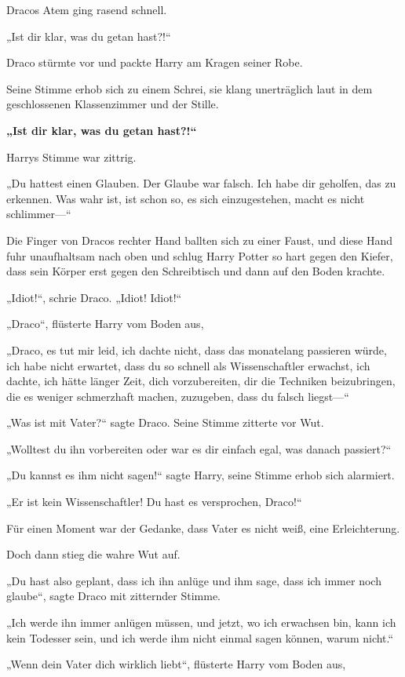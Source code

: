 {Dracos Atem ging rasend schnell.

„Ist dir klar, was du getan hast?!“

Draco stürmte vor und packte Harry am Kragen seiner Robe.

Seine Stimme erhob sich zu einem Schrei, sie klang unerträglich laut in dem geschlossenen Klassenzimmer und der Stille.

\textbf{„Ist dir klar, was du getan hast?!“}

Harrys Stimme war zittrig.

„Du hattest einen Glauben. Der Glaube war falsch. Ich habe dir geholfen, das zu erkennen. Was wahr ist, ist schon so, es sich einzugestehen, macht es nicht schlimmer—“

Die Finger von Dracos rechter Hand ballten sich zu einer Faust, und diese Hand fuhr unaufhaltsam nach oben und schlug Harry Potter so hart gegen den Kiefer, dass sein Körper erst gegen den Schreibtisch und dann auf den Boden krachte.

„Idiot!“, schrie Draco. „Idiot! Idiot!“

„Draco“, flüsterte Harry vom Boden aus,

„Draco, es tut mir leid, ich dachte nicht, dass das monatelang passieren würde, ich habe nicht erwartet, dass du so schnell als Wissenschaftler erwachst, ich dachte, ich hätte länger Zeit, dich vorzubereiten, dir die Techniken beizubringen, die es weniger schmerzhaft machen, zuzugeben, dass du falsch liegst—“

„Was ist mit Vater?“ sagte Draco. Seine Stimme zitterte vor Wut.

„Wolltest du ihn vorbereiten oder war es dir einfach egal, was danach passiert?“

„Du kannst es ihm nicht sagen!“ sagte Harry, seine Stimme erhob sich alarmiert.

„Er ist kein Wissenschaftler! Du hast es versprochen, Draco!“

Für einen Moment war der Gedanke, dass Vater es nicht weiß, eine Erleichterung.

Doch dann stieg die wahre Wut auf.

„Du hast also geplant, dass ich ihn anlüge und ihm sage, dass ich immer noch glaube“, sagte Draco mit zitternder Stimme.

„Ich werde ihn immer anlügen müssen, und jetzt, wo ich erwachsen bin, kann ich kein Todesser sein, und ich werde ihm nicht einmal sagen können, warum nicht.“

„Wenn dein Vater dich wirklich liebt“, flüsterte Harry vom Boden aus,

}
